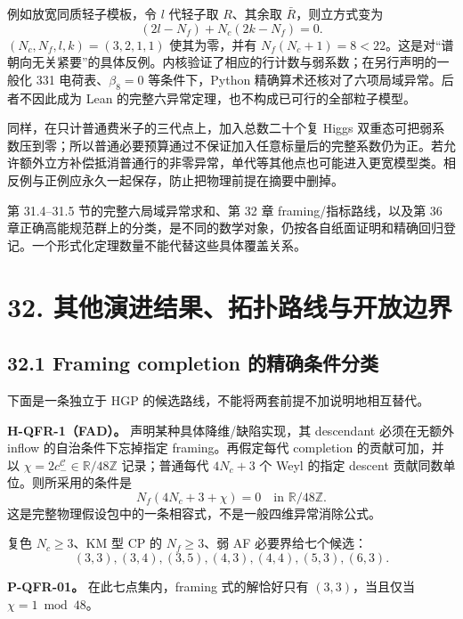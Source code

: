 \documentclass[
  11pt,
  oneside]{book}
\begin{document}
例如放宽同质轻子模板，令 \(l\) 代轻子取 \(R\)、其余取
\(\bar R\)，则立方式变为 \[
(2l-N_f)+N_c(2k-N_f)=0.
\] \((N_c,N_f,l,k)=(3,2,1,1)\) 使其为零，并有
\(N_f(N_c+1)=8<22\)。这是对``谱朝向无关紧要''的具体反例。内核验证了相应的行计数与弱系数；在另行声明的一般化
331 电荷表、\(\beta_8=0\) 等条件下，Python
精确算术还核对了六项局域异常。后者不因此成为 Lean
的完整六异常定理，也不构成已可行的全部粒子模型。

同样，在只计普通费米子的三代点上，加入总数二十个复 Higgs
双重态可把弱系数压到零；所以普通必要预算通过不保证加入任意标量后的完整系数仍为正。若允许额外立方补偿抵消普通行的非零异常，单代等其他点也可能进入更宽模型类。相反例与正例应永久一起保存，防止把物理前提在摘要中删掉。

第 31.4--31.5 节的完整六局域异常求和、第 32 章 framing/指标路线，以及第
36
章正确高能规范群上的分类，是不同的数学对象，仍按各自纸面证明和精确回归登记。一个形式化定理数量不能代替这些具体覆盖关系。

\hypertarget{ch-32}{%
\chapter{32. 其他演进结果、拓扑路线与开放边界}\label{ch-32}}

\hypertarget{framing-completion-ux7684ux7cbeux786eux6761ux4ef6ux5206ux7c7b}{%
\section{32.1 Framing completion
的精确条件分类}\label{framing-completion-ux7684ux7cbeux786eux6761ux4ef6ux5206ux7c7b}}

下面是一条独立于 HGP 的候选路线，不能将两套前提不加说明地相互替代。

\textbf{H-QFR-1（FAD）。} 声明某种具体降维/缺陷实现，其 descendant
必须在无额外 inflow 的自治条件下忘掉指定 framing。再假定每代 completion
的贡献可加，并以 \(\chi=2c_-^{\mathcal C}\in\mathbb R/48\mathbb Z\)
记录；普通每代 \(4N_c+3\) 个 Weyl 的指定 descent
贡献同数单位。则所采用的条件是 \[
N_f(4N_c+3+\chi)=0\quad\text{in }\mathbb R/48\mathbb Z.
\] 这是完整物理假设包中的一条相容式，不是一般四维异常消除公式。

复色 \(N_c\ge3\)、KM 型 CP 的 \(N_f\ge3\)、弱 AF 必要界给七个候选： \[
(3,3),(3,4),(3,5),(4,3),(4,4),(5,3),(6,3).
\]

\protect\hypertarget{p-qfr-01}{}{}

\textbf{P-QFR-01。} 在此七点集内，framing 式的解恰好只有
\((3,3)\)，当且仅当 \(\chi=1\bmod48\)。
\end{document}
